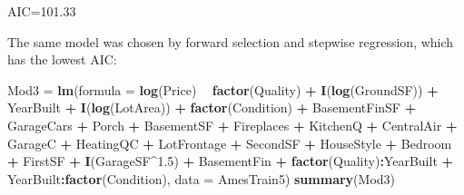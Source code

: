 \documentclass[
]{article}
\newenvironment{Shaded}{\begin{snugshade}}{\end{snugshade}}
\newcommand{\DataTypeTok}[1]{\textcolor[rgb]{0.13,0.29,0.53}{#1}}
\newcommand{\FloatTok}[1]{\textcolor[rgb]{0.00,0.00,0.81}{#1}}
\newcommand{\KeywordTok}[1]{\textcolor[rgb]{0.13,0.29,0.53}{\textbf{#1}}}
\newcommand{\NormalTok}[1]{#1}
\newcommand{\OperatorTok}[1]{\textcolor[rgb]{0.81,0.36,0.00}{\textbf{#1}}}
\newcommand{\StringTok}[1]{\textcolor[rgb]{0.31,0.60,0.02}{#1}}
\begin{document}
AIC=101.33

The same model was chosen by forward selection and stepwise regression,
which has the lowest AIC:

\begin{Shaded}
\begin{Highlighting}[]
\NormalTok{Mod3 =}\StringTok{ }\KeywordTok{lm}\NormalTok{(}\DataTypeTok{formula =} \KeywordTok{log}\NormalTok{(Price) }\OperatorTok{~}\StringTok{ }\KeywordTok{factor}\NormalTok{(Quality) }\OperatorTok{+}\StringTok{ }\KeywordTok{I}\NormalTok{(}\KeywordTok{log}\NormalTok{(GroundSF)) }\OperatorTok{+}\StringTok{ }
\StringTok{    }\NormalTok{YearBuilt }\OperatorTok{+}\StringTok{ }\KeywordTok{I}\NormalTok{(}\KeywordTok{log}\NormalTok{(LotArea)) }\OperatorTok{+}\StringTok{ }\KeywordTok{factor}\NormalTok{(Condition) }\OperatorTok{+}\StringTok{ }\NormalTok{BasementFinSF }\OperatorTok{+}\StringTok{ }
\StringTok{    }\NormalTok{GarageCars }\OperatorTok{+}\StringTok{ }\NormalTok{Porch }\OperatorTok{+}\StringTok{ }\NormalTok{BasementSF }\OperatorTok{+}\StringTok{ }\NormalTok{Fireplaces }\OperatorTok{+}\StringTok{ }\NormalTok{KitchenQ }\OperatorTok{+}\StringTok{ }
\StringTok{    }\NormalTok{CentralAir }\OperatorTok{+}\StringTok{ }\NormalTok{GarageC }\OperatorTok{+}\StringTok{ }\NormalTok{HeatingQC }\OperatorTok{+}\StringTok{ }\NormalTok{LotFrontage }\OperatorTok{+}\StringTok{ }\NormalTok{SecondSF }\OperatorTok{+}\StringTok{ }
\StringTok{    }\NormalTok{HouseStyle }\OperatorTok{+}\StringTok{ }\NormalTok{Bedroom }\OperatorTok{+}\StringTok{ }\NormalTok{FirstSF }\OperatorTok{+}\StringTok{ }\KeywordTok{I}\NormalTok{(GarageSF}\OperatorTok{^}\FloatTok{1.5}\NormalTok{) }\OperatorTok{+}\StringTok{ }\NormalTok{BasementFin }\OperatorTok{+}\StringTok{ }
\StringTok{    }\KeywordTok{factor}\NormalTok{(Quality)}\OperatorTok{:}\NormalTok{YearBuilt }\OperatorTok{+}\StringTok{ }\NormalTok{YearBuilt}\OperatorTok{:}\KeywordTok{factor}\NormalTok{(Condition), }
    \DataTypeTok{data =}\NormalTok{ AmesTrain5)}
\KeywordTok{summary}\NormalTok{(Mod3)}
\end{Highlighting}
\end{Shaded}
\end{document}
